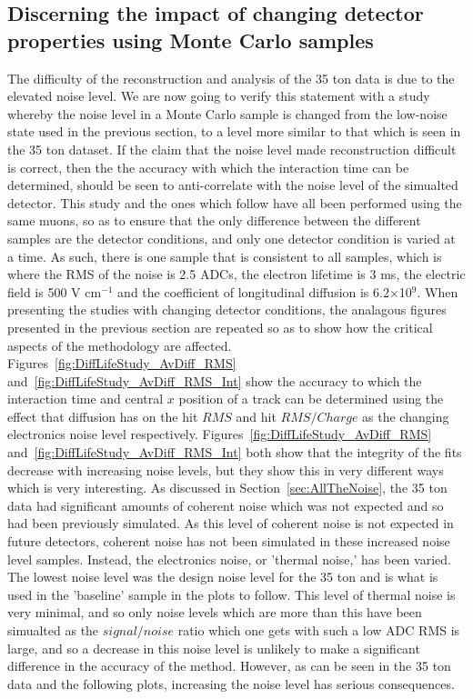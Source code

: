 \subsection{Discerning the impact of changing detector properties using Monte Carlo samples} \label{sec:DiffMCStudies}
The difficulty of the reconstruction and analysis of the 35 ton data is due to the elevated noise level. We are now going to verify this statement with a study whereby the noise level in a Monte Carlo sample is changed from the low-noise state used in the previous section, to a level more similar to that which is seen in the 35 ton dataset. If the claim that the noise level made reconstruction difficult is correct, then the the accuracy with which the interaction time can be determined, should be seen to anti-correlate with the noise level of the simualted detector. This study and the ones which follow have all been performed using the same muons, so as to ensure that the only difference between the different samples are the detector conditions, and only one detector condition is varied at a time. As such, there is one sample that is consistent to all samples, which is where the RMS of the noise is 2.5 ADCs, the electron lifetime is 3 ms, the electric field is 500 V cm$^{-1}$ and the coefficient of longitudinal diffusion is 6.2$\times$10$^9$. When presenting the studies with changing detector conditions, the analagous figures presented in the previous section are repeated so as to show how the critical aspects of the methodology are affected. \\

Figures~\ref{fig:DiffLifeStudy_AvDiff_RMS} and~\ref{fig:DiffLifeStudy_AvDiff_RMS_Int} show the accuracy to which the interaction time and central $x$ position of a track can be determined using the effect that diffusion has on the hit $RMS$ and hit $RMS/Charge$ as the changing electronics noise level respectively. Figures~\ref{fig:DiffLifeStudy_AvDiff_RMS} and~\ref{fig:DiffLifeStudy_AvDiff_RMS_Int} both show that the integrity of the fits decrease with increasing noise levels, but they show this in very different ways which is very interesting. As discussed in Section~\ref{sec:AllTheNoise}, the 35 ton data had significant amounts of coherent noise which was not expected and so had been previously simulated. As this level of coherent noise is not expected in future detectors, coherent noise has not been simulated in these increased noise level samples. Instead, the electronics noise, or 'thermal noise,' has been varied. The lowest noise level was the design noise level for the 35 ton and is what is used in the 'baseline' sample in the plots to follow. This level of thermal noise is very minimal, and so only noise levels which are more than this have been simualted as the $signal/noise$ ratio which one gets with such a low ADC RMS is large, and so a decrease in this noise level is unlikely to make a significant difference in the accuracy of the method. However, as can be seen in the 35 ton data and the following plots, increasing the noise level has serious consequences. \\

